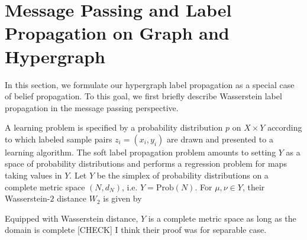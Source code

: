\documentclass[letterpaper]{article} %
\begin{document}
\section{Message Passing and Label Propagation on Graph and Hypergraph}
In this section, we formulate our hypergraph label propagation as a special case of belief propagation. To this goal, we first briefly describe Wasserstein label propagation \cite{Solomon:2014} in the message passing perspective.


A learning problem is specified by a probability distribution $p$ on $X\times Y$ according to which labeled sample pairs $z_i=\left( x_i,y_i \right)$ are drawn and presented to a learning algorithm. The soft label propagation problem amounts to setting $Y$ as a space of probability distributions and performs a regression problem for maps taking values in $Y$. Let 
$Y$ be the simplex of probability distributions on a complete metric space $\left( N,d_N \right)$, i.e. $Y=\mathrm{Prob}\left( N \right)$. For $\mu, \nu\in Y$, their Wasserstein-$2$ distance $W_2$ is given by 

Equipped with Wasserstein distance, $Y$ is a complete metric space as long as the domain is complete \cite[Theorem 6.18]{villani2003topics} {\color{blue}[CHECK] I think their proof was for separable case}. 
\end{document}
